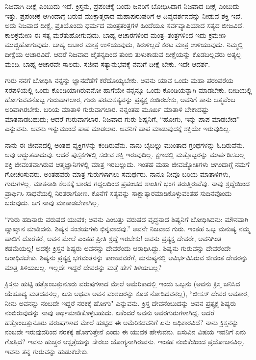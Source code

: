 ನಿಜವಾಗಿ ದೀಕ್ಷೆ ಎಂಬುದು ಇದೆ. ಕ್ರಿಸ್ತನು, ಪ್ರಪಂಚಕ್ಕೆ ಬಂದು ಜನರಿಗೆ ಬೋಧಿಸಿದಾಗ ನಿಜವಾದ ದೀಕ್ಷೆ ಎಂಬುದು ಇತ್ತು. ಪ್ರಪಂಚಕ್ಕೆ ಆಗಿಂದಾಗ್ಗೆ ಬರುವ ಮುಕ್ತಾತ್ಮರಾದ ಮಹಾಪುರುಷರಿಗೆ ಆ ದಿವ್ಯದರ್ಶನವನ್ನು ನೀಡುವ ಶಕ್ತಿ ಇದೆ. ಅದು ನಿಜವಾದ ದೀಕ್ಷೆ, ಪ್ರತಿಯೊಂದು ಧರ್ಮದ ಮಂತ್ರತಂತ್ರಗಳ ಹಿಂದೆಯೂ ಸರ್ವವ್ಯಾಪಿಯಾದ ಸತ್ಯದ ಬೀಜವಿದೆ. ಕಾಲಕ್ರಮೇಣ ಈ ಸತ್ಯ ಮರೆತುಹೋಗುವುದು. ಬಾಹ್ಯ ಆಚಾರಗಳಿಂದ ಮಂತ್ರ–ತಂತ್ರಗಳಿಂದ ಇದು ಕ್ರಮೇಣ ಮುಚ್ಚಿಹೋಗುವುದು. ಬಾಹ್ಯ ಆಚಾರ ಮಾತ್ರ ಉಳಿಯುವುದು, ತಿರುಳಿಲ್ಲದೆ ಕರಟ ಮಾತ್ರ ಉಳಿಯುವುದು. ನಿಮ್ಮಲ್ಲಿ ದೀಕ್ಷೆಯ ಆಚಾರವಿದೆ. ಆದರೆ ನಿಜವಾದ ಚೈತನ್ಯದಿಂದ ತುಂಬಿ ತುಳುಕಾಡುವ ದೀಕ್ಷೆಯನ್ನು ಕೊಡಬಲ್ಲವರು ಅತ್ಯಲ್ಪ ಮಂದಿ. ಬಾಹ್ಯ ಆಚಾರವೇ ಸಾಲದು. ಸಜೀವ ಸತ್ಯಾನುಭವಕ್ಕೆ ನಮಗೆ ದೀಕ್ಷೆ ಬೇಕು. ಇದೇ ಆದರ್ಶ.

ಗುರು ನನಗೆ ಬೋಧಿಸಿ ನನ್ನನ್ನು ಜ್ಞಾನದೆಡೆಗೆ ಕರೆದೊಯ್ಯಬೇಕು. ಅವನು ಯಾವ ಒಂದು ಮಹಾ ಪರಂಪರೆಯ ಸರಪಳಿಯಲ್ಲಿ ಒಂದು ಕೊಂಡಿಯಾಗಿರುವನೋ ಹಾಗೆಯೇ ನನ್ನನ್ನೂ ಒಂದು ಕೊಂಡಿಯನ್ನಾಗಿ ಮಾಡಬೇಕು. ಬೀದಿಯಲ್ಲಿ ಹೋಗುವವನೊಬ್ಬ ಗುರುವಾಗಲಾರ, ಗುರು ಪರಮಸತ್ಯವನ್ನು ಪ್ರತ್ಯಕ್ಷ ಕಂಡಿರಬೇಕು, ಅವನಿಗೆ ತಾನು ಆತ್ಮವೆಂಬ ಅರಿವಾಗಿರಬೇಕು. ಬರಿಯ ಮಾತಾಳಿ ಗುರುವಾಗಲಾರ. ನನ್ನಂತಹ ಮೂರ್ಖ ಮಾತಾಳಿ ಬೇಕಾದಷ್ಟು ಮಾತನಾಡಬಹುದು; ಆದರೆ ಗುರುವಾಗಲಾರ. ನಿಜವಾದ ಗುರು ಶಿಷ್ಯನಿಗೆ, “ಹೋಗು, ಇನ್ನು ಪಾಪ ಮಾಡಬೇಡ'' ಎನ್ನುವನು. ಅವನು ಇನ್ನುಮುಂದೆ ಪಾಪ ಮಾಡಲಾರ. ಅವನಿಗೆ ಪಾಪ ಮಾಡುವುದಕ್ಕೆ ಶಕ್ತಿಯೇ ಇರುವುದಿಲ್ಲ.

ನಾನು ಈ ಜೀವನದಲ್ಲಿ ಅಂತಹ ವ್ಯಕ್ತಿಗಳನ್ನು ಕಂಡಿರುವೆನು. ನಾನು ಬೈಬಲ್ಲು ಮುಂತಾದ ಗ್ರಂಥಗಳನ್ನು ಓದಿರುವೆನು. ಅವು ಅದ್ಭುತವಾದುವು. ಆದರೆ ಪುಸ್ತಕಗಳಲ್ಲಿ ಸಜೀವ ಶಕ್ತಿ ಇರುವುದಿಲ್ಲ. ಕ್ಷಣದಲ್ಲಿ ಮತ್ತೊಬ್ಬರನ್ನು ಮಾರ್ಪಡಿಸಬಲ್ಲ ಶಕ್ತಿ ಜೀವಂತವಾಗಿರುವ ಆತ್ಮಜ್ಞಾನಿಗಳಲ್ಲಿ ಮಾತ್ರ ಇರಬಲ್ಲುದು. ಇಂತಹ ಮಹಾ ಜೀವಜ್ಯೋತಿಗಳು ಆಗಿಂದಾಗ್ಗೆ ನಮಗೆ ಗೋಚರಿಸುವರು. ಅಂತಹವರು ಮಾತ್ರ ಗುರುಗಳಾಗಲು ಸಮರ್ಥರು. ನಾನೂ ನೀವೂ ಬರಿಯ ಮಾತಾಳಿಗಳು, ಗುರುಗಳಲ್ಲ. ಮಾತನಾಡಿ ಕೆಲಸಕ್ಕೆ ಬಾರದ ಗದ್ದಲದಿಂದ ಪ್ರಪಂಚದ ಶಾಂತಿಗೆ ಭಂಗ ತರುತ್ತಿರುವೆವು. ನಾವು ಶ್ರದ್ದೆಯಿಂದ ಪ್ರಾರ್ಥಿಸಿ ಸಾಧನೆಯಲ್ಲಿ ನಿರತರಾಗೋಣ. ಕೊನೆಗೆ ಸತ್ಯವನ್ನು ಸಾಕ್ಷಾತ್ಕಾರಮಾಡಿಕೊಳ್ಳು\-ವಂತಹ ಸುದಿನವೊಂದು ಬರುವುದು. ಆಗ ನಾವು ಮಾತಾಡಬೇಕಾಗಿಲ್ಲ.

“ಗುರು ಹದಿನಾರು ವರುಷದ ಯುವಕ; ಅವನು ಎಂಬತ್ತು ವರುಷದ ವೃದ್ಧನಾದ ಶಿಷ್ಯನಿಗೆ ಬೋಧಿಸಿದನು: ಮೌನವಾಗಿ ವ್ಯಾಖ್ಯಾನ ಮಾಡಿದನು. ಶಿಷ್ಯನ ಸಂಶಯಗಳು ಛಿನ್ನವಾದವು.” ಅವನೇ ನಿಜವಾದ ಗುರು. ಇಂತಹ ಒಬ್ಬ ಮನುಷ್ಯ ನಮ್ಮ ಪಾಲಿಗೆ ದೊರೆತರೆ, ಅವನ ಮೇಲೆ ಎಂತಹ ಪ್ರೀತಿ ಶ್ರದ್ದೆ ಇರಬೇಕು! ಅವನು ಪ್ರತ್ಯಕ್ಷ ದೇವರೇ, ಅವನಿಗಿಂತ ಕಡಮೆಯಲ್ಲ! ಅದಕ್ಕೇ ಕ್ರಿಸ್ತನ ಶಿಷ್ಯರು ಅವನನ್ನು ದೇವರೆಂದು ಆರಾಧಿಸಿದ್ದು. ಶಿಷ್ಯನು ಗುರುವನ್ನು ದೇವರೆಂದೇ ಆರಾಧಿಸಬೇಕು. ಶಿಷ್ಯನು ಪ್ರತ್ಯಕ್ಷ ಭಗವಂತನನ್ನು ಕಾಣುವವರೆಗೆ, ಮನುಷ್ಯನಲ್ಲಿ ಆವಿರ್ಭವಿಸಿರುವ ಜೀವಂತ ದೇವರನ್ನು ಮಾತ್ರ ತಿಳಿಯಬಲ್ಲ. ಇಲ್ಲದೇ ಇದ್ದರೆ ದೇವರನ್ನು ಮತ್ತೆ ಹೇಗೆ ತಿಳಿಯಬಲ್ಲ?

ಕ್ರಿಸ್ತನು ಹುಟ್ಟಿ ಹತ್ತೊಂಬತ್ತುನೂರು ವರುಷಗಳಾದ ಮೇಲೆ ಅಮೆರಿಕಾದಲ್ಲಿ ಇಂದು ಒಬ್ಬನು (ಅವನು ಕ್ರಿಸ್ತ ಜನಿಸಿದ ಯೆಹೂದ್ಯ ಮತದವನಲ್ಲ, ಏಸು ಅಥವಾ ಅವನ ವಂಶಜರನ್ನು ಕೂಡ ನೋಡಿದವನಲ್ಲ), “ಜೀಸಸ್ ದೇವರ ಅವತಾರ, ನೀನು ಅವನನ್ನು ನಂಬದೇ ಇದ್ದರೆ ನರಕಕ್ಕೆ ಹೋಗು" ಎನ್ನುವನು. ಕ್ರಿಸ್ತ ದೇವನೆಂಬುದನ್ನು ಅವನ ಪ್ರತ್ಯಕ್ಷ ಶಿಷ್ಯರು ನಂಬಿರುವುದನ್ನು ನಾವು ಅರ್ಥಮಾಡಿಕೊಳ್ಳಬಹುದು. ಏಕೆಂದರೆ ಅವನು ಅವರ\break ಗುರುಗಳಾಗಿದ್ದ. ಆದರೆ ಹತ್ತೊಂಬತ್ತುನೂರು ವರುಷಗಳಾದ ಮೇಲೆ ಹುಟ್ಟಿದ ಈ ಅಮೆರಿಕದವನಿಗೆ ಏನು ಅಧಿಕಾರವಿದೆ? ನಾನು ಕ್ರಿಸ್ತನನ್ನು ನಂಬದೇ ಇರುವುದರಿಂದ ನರಕಕ್ಕೆ ಹೋಗುತ್ತೇನೆ ಎಂದು ಈ ಯುವಕ ಹೇಳುವನು. ಏಸುವಿನ ವಿಷಯ ಇವನಿಗೆ ಏನು ಗೊತ್ತಿದೆ? ಇವನು ಹುಚ್ಚರ ಆಸ್ಪತ್ರೆಯನ್ನು ಸೇರಲು ಯೋಗ್ಯನಾಗಿರುವನು. ಇಂತಹ ನಂಬಿಕೆಯಿಂದ ಪ್ರಯೋಜನವಿಲ್ಲ. ಇವನು ತನ್ನ ಗುರುವನ್ನು ಹುಡುಕಬೇಕು.

